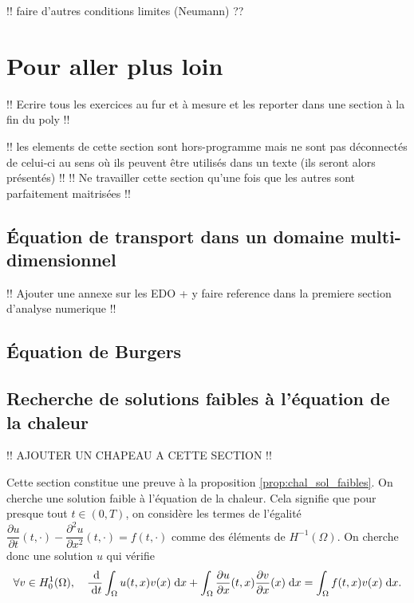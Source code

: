 \documentclass[12pt,a4paper,twoside]{article}
\begin{document}
!! faire d'autres conditions limites (Neumann) ??

\section{Pour aller plus loin}

!! Ecrire tous les exercices au fur et \`a mesure et les reporter
dans une section \`a la fin du poly !!


!! les elements de cette section sont hors-programme mais ne sont pas 
d\'econnect\'es de celui-ci au sens o\`u ils peuvent \^etre utilis\'es 
dans un texte (ils seront alors pr\'esent\'es) !!
!! Ne travailler cette section qu'une fois que les autres sont parfaitement maitris\'ees !!

\subsection{\'Equation de transport dans un domaine multi-dimensionnel}
\label{subsec:transport_multiD}



!! Ajouter une annexe sur les EDO + y faire reference 
dans la premiere section d'analyse numerique !!


\subsection{\'Equation de Burgers}


\subsection{Recherche de solutions faibles \`a l'\'equation de la chaleur}
\label{subsec:chal_sol_faibles}

!! AJOUTER UN CHAPEAU A CETTE SECTION !!


Cette section constitue une preuve \`a la proposition
\ref{prop:chal_sol_faibles}.
On cherche une solution faible \`a l'\'equation de la chaleur.
Cela signifie que pour presque tout $t \in (0,T)$,
on consid\`ere les termes de l'\'egalit\'e
$\dfrac{\partial u}{\partial t}(t,\cdot) 
- \dfrac{\partial^2 u}{\partial x^2}(t,\cdot) = f(t,\cdot)$
comme des \'el\'ements de $H^{-1}(\Omega)$.
On cherche donc une solution $u$ qui v\'erifie
\begin{align}
  \label{eq:chal_vari}
  \forall v \in H^1_0(\Omega) ,  \quad
  \dfrac{\;\mathrm{d}}{\;\mathrm{d} t} \int_{\Omega} u(t,x) v(x) \;\mathrm{d} x
  + \int_{\Omega} \dfrac{\partial u}{\partial x}(t,x) \dfrac{\partial v}{\partial x}(x) \;\mathrm{d} x
  = \int_{\Omega} f(t,x) v(x) \;\mathrm{d} x .
\end{align}
\end{document}
